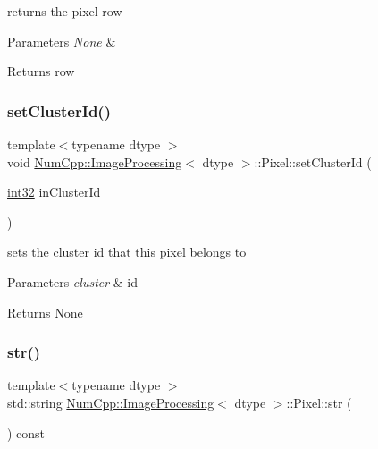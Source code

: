 returns the pixel row


\begin{DoxyParams}{Parameters}
{\em None} & \\
\hline
\end{DoxyParams}
\begin{DoxyReturn}{Returns}
row 
\end{DoxyReturn}
\mbox{\label{class_num_cpp_1_1_image_processing_1_1_pixel_acd32a7a205a4cc81124036a7c28a498a}} 
\subsubsection{\texorpdfstring{set\+Cluster\+Id()}{setClusterId()}}
{\footnotesize\ttfamily template$<$typename dtype $>$ \\
void \mbox{\hyperlink{class_num_cpp_1_1_image_processing}{Num\+Cpp\+::\+Image\+Processing}}$<$ dtype $>$\+::Pixel\+::set\+Cluster\+Id (\begin{DoxyParamCaption}\item[{\mbox{\hyperlink{namespace_num_cpp_acf3eb1592f8b248ff0a236634864633c}{int32}}}]{in\+Cluster\+Id }\end{DoxyParamCaption})\hspace{0.3cm}{\ttfamily [inline]}}

sets the cluster id that this pixel belongs to


\begin{DoxyParams}{Parameters}
{\em cluster} & id\\
\hline
\end{DoxyParams}
\begin{DoxyReturn}{Returns}
None 
\end{DoxyReturn}
\mbox{\label{class_num_cpp_1_1_image_processing_1_1_pixel_a0a5f411bdc0968593aafb9bad247382b}} 
\subsubsection{\texorpdfstring{str()}{str()}}
{\footnotesize\ttfamily template$<$typename dtype $>$ \\
std\+::string \mbox{\hyperlink{class_num_cpp_1_1_image_processing}{Num\+Cpp\+::\+Image\+Processing}}$<$ dtype $>$\+::Pixel\+::str (\begin{DoxyParamCaption}{ }\end{DoxyParamCaption}) const\hspace{0.3cm}{\ttfamily [inline]}}

